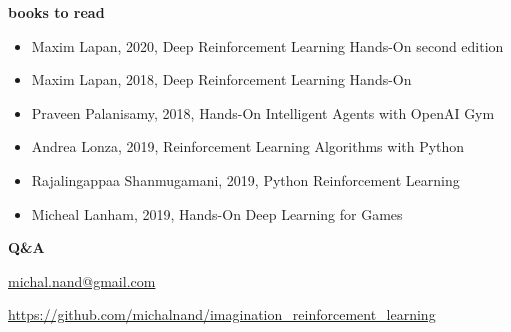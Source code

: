 \documentclass[xcolor=dvipsnames]{beamer}
\begin{document}
\begin{frame}{\bf books to read}

\begin{itemize}
  \item Maxim Lapan, 2020, Deep Reinforcement Learning Hands-On second edition
  \item Maxim Lapan, 2018, Deep Reinforcement Learning Hands-On
  \item Praveen Palanisamy, 2018, Hands-On Intelligent Agents with OpenAI Gym
  \item Andrea Lonza, 2019, Reinforcement Learning Algorithms with Python
  \item Rajalingappaa Shanmugamani, 2019, Python Reinforcement Learning
  \item Micheal Lanham, 2019, Hands-On Deep Learning for Games
\end{itemize}


\end{frame}

\begin{frame}{\bf Q\&A}


\url{michal.nand@gmail.com}

\url{https://github.com/michalnand/imagination_reinforcement_learning}

 
\end{frame}
\end{document}
